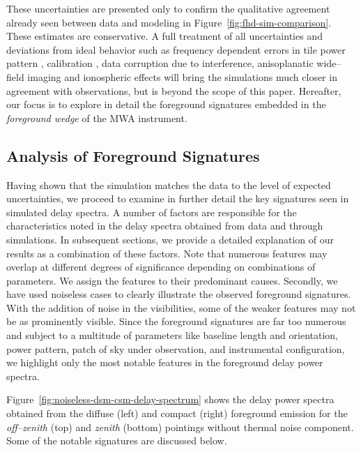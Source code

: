 \documentclass[preprint2,iop,numberedappendix,twocolappendix,appendixfloats]{emulateapj}
\begin{document}
These uncertainties are presented only to confirm the qualitative agreement already seen between data and modeling in Figure~\ref{fig:fhd-sim-comparison}. These estimates are conservative. A full treatment of all uncertainties and deviations from ideal behavior such as frequency dependent errors in tile power pattern \citep{ber15}, calibration \citep{dat10}, data corruption due to interference, anisoplanatic wide--field imaging and ionospheric effects \citep{int09} will bring the simulations much closer in agreement with observations, but is beyond the scope of this paper. Hereafter, our focus is to explore in detail the foreground signatures embedded in the {\it foreground wedge} of the MWA instrument.

\subsection{Analysis of Foreground Signatures}\label{sec:FG-analysis}

Having shown that the simulation matches the data to the level of expected uncertainties, we proceed to examine in further detail the key signatures seen in simulated delay spectra. A number of factors are responsible for the characteristics noted in the delay spectra obtained from data and through simulations. In subsequent sections, we provide a detailed explanation of our results as a combination of these factors. Note that numerous features may overlap at different degrees of significance depending on combinations of parameters. We assign the features to their predominant causes. Secondly, we have used noiseless cases to clearly illustrate the observed foreground signatures. With the addition of noise in the visibilities, some of the weaker features may not be as prominently visible. Since the foreground signatures are far too numerous and subject to a multitude of parameters like baseline length and orientation, power pattern, patch of sky under observation, and instrumental configuration, we highlight only the most notable features in the foreground delay power spectra.

Figure~\ref{fig:noiseless-dsm-csm-delay-spectrum} shows the delay power spectra obtained from the diffuse (left) and compact (right) foreground emission for the {\it off--zenith} (top) and {\it zenith} (bottom) pointings without thermal noise component. Some of the notable signatures are discussed below.
\end{document}
